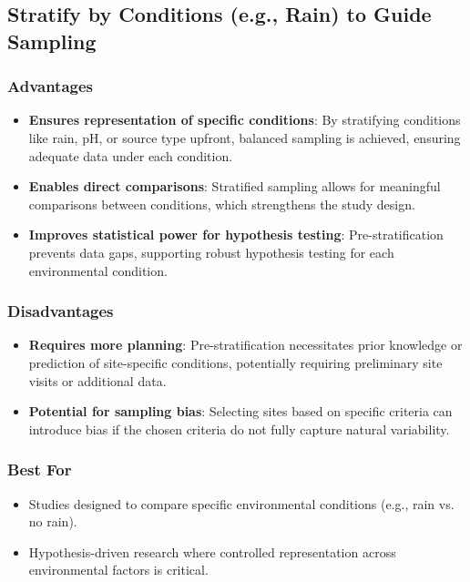 \documentclass{article}
\begin{document}
	\subsection{Stratify by Conditions (e.g., Rain) to Guide Sampling}
\begin{multicols}{2}
	\subsubsection{Advantages}
	\begin{itemize}
		\item \textbf{Ensures representation of specific conditions}: By stratifying conditions like rain, pH, or source type upfront, balanced sampling is achieved, ensuring adequate data under each condition.
		\item \textbf{Enables direct comparisons}: Stratified sampling allows for meaningful comparisons between conditions, which strengthens the study design.
		\item \textbf{Improves statistical power for hypothesis testing}: Pre-stratification prevents data gaps, supporting robust hypothesis testing for each environmental condition.
	\end{itemize}
	\columnbreak
	\subsubsection*{Disadvantages}
	\begin{itemize}
		\item \textbf{Requires more planning}: Pre-stratification necessitates prior knowledge or prediction of site-specific conditions, potentially requiring preliminary site visits or additional data.
		\item \textbf{Potential for sampling bias}: Selecting sites based on specific criteria can introduce bias if the chosen criteria do not fully capture natural variability.
	\end{itemize}
\end{multicols}	
	
	
	\subsubsection*{Best For}
	\begin{itemize}
		\item Studies designed to compare specific environmental conditions (e.g., rain vs. no rain).
		\item Hypothesis-driven research where controlled representation across environmental factors is critical.
	\end{itemize}
	
\end{document}
